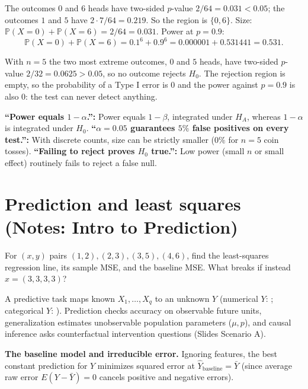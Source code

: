 \documentclass[10pt]{scrartcl}
\begin{document}
\begin{example*}[Six tosses of a coin, two-sided, $\alpha = 0.05$]
The outcomes $0$ and $6$ heads have two-sided $p$-value $2/64 = 0.031 < 0.05$; the outcomes $1$ and $5$ have $2\cdot 7/64 = 0.219$. So the region is $\{0, 6\}$. Size: $\mathbb P(X=0) + \mathbb P(X=6) = 2/64 = 0.031$. Power at $p = 0.9$:
\[
  \mathbb P(X = 0) + \mathbb P(X = 6) = 0.1^6 + 0.9^6 = 0.000001 + 0.531441 = 0.531 .
\]
\end{example*}

\revisit With $n = 5$ the two most extreme outcomes, $0$ and $5$ heads, have two-sided $p$-value $2/32 = 0.0625 > 0.05$, so no outcome rejects $H_0$. The rejection region is empty, so the probability of a Type I error is $0$ and the power against $p = 0.9$ is also $0$: the test can never detect anything.

\begin{trapbox}
  \ii \textbf{``Power equals $1 - \alpha$.'':} Power equals $1 - \beta$, integrated under $H_A$, whereas $1 - \alpha$ is integrated under $H_0$.
  \ii \textbf{``$\alpha = 0.05$ guarantees $5\%$ false positives on every test.'':} With discrete counts, size can be strictly smaller ($0\%$ for $n=5$ coin tosses).
  \ii \textbf{``Failing to reject proves $H_0$ true.'':} Low power (small $n$ or small effect) routinely fails to reject a false null.
\end{trapbox}

\section{Prediction and least squares (Notes: Intro to Prediction)}

\begin{qbox}
  For $(x,y)$ pairs $(1,2), (2,3), (3,5), (4,6)$, find the least-squares regression line, its sample MSE, and the baseline MSE. What breaks if instead $x = (3, 3, 3, 3)$?
\end{qbox}

A predictive task maps known  $X_1,\dots,X_q$ to an unknown  $Y$ (numerical $Y$: ; categorical $Y$: ). Prediction checks accuracy on observable future units, generalization estimates unobservable population parameters ($\mu, p$), and causal inference asks counterfactual intervention questions (Slides Scenario A).

\medskip\noindent\textbf{The baseline model and irreducible error.} Ignoring features, the best constant prediction for $Y$ minimizes squared error at $\hat Y_{\text{baseline}} = \bar Y$ (since average raw error $E(Y - \bar Y)=0$ cancels positive and negative errors).
\end{document}
